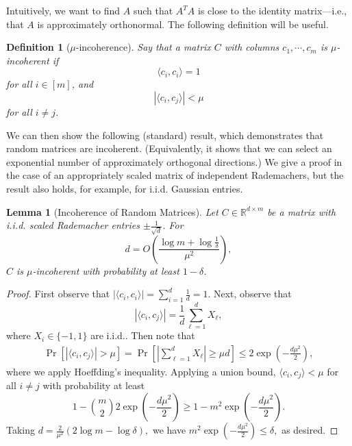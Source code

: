 \documentclass[11pt]{article}
\newtheorem{lemma}[theorem]{Lemma}
\newtheorem{definition}[theorem]{Definition}
\newcommand{\RR}{\mathbb{R}}
\begin{document}
Intuitively, we want to find $A$ such that $A^TA$ is close to the identity matrix---i.e., that $A$ is approximately orthonormal. The following definition will be useful.

\begin{definition}[$\mu$-incoherence]
    Say that a matrix $C$ with columns $c_1,\cdots,c_m$ is $\mu$-incoherent if 
    \begin{equation}
        \langle c_i, c_i\rangle = 1
    \end{equation}
    for all $i\in [m]$, and
    \begin{equation}
        |\langle c_i, c_j\rangle| < \mu
    \end{equation}
    for all $i\neq j$.
\end{definition}

We can then show the following (standard) result, which demonstrates that random matrices are incoherent. (Equivalently, it shows that we can select an exponential number of approximately orthogonal directions.) We give a proof in the case of an appropriately scaled matrix of independent Rademachers, but the result also holds, for example, for i.i.d. Gaussian entries.
\begin{lemma}[Incoherence of Random Matrices]\label{prop:incoherent}
    Let $C\in \RR^{d\times m}$ be a matrix with i.i.d. scaled Rademacher entries $\pm\frac{1}{\sqrt{d}}$. For
    \begin{equation}
        d = O\left(\frac{\log m + \log \frac{1}{\delta}}{\mu^2}\right),
    \end{equation}
    $C$ is $\mu$-incoherent with probability at least $1 - \delta$.
\end{lemma}
\begin{proof}
    First observe that $|\langle c_i, c_i\rangle| = \sum_{i=1}^d \frac{1}{d} = 1.$ Next, observe that
    \begin{equation}
        |\langle c_i, c_j\rangle| = \frac{1}{d}\sum_{\ell=1}^d X_\ell,
    \end{equation}
    where $X_i\in \{-1,1\}$ are i.i.d.. Then note that
    \begin{align}
        \Pr[|\langle c_i, c_j\rangle| > \mu] = \Pr\left[\left|\sum_{\ell=1}^d X_\ell\right|\ge \mu d\right] \le 2\exp\left(-\frac{d\mu^2}{2}\right),
    \end{align}
    where we apply Hoeffding's inequality. Applying a union bound, $\langle c_i, c_j \rangle < \mu$ for all $i\neq j$ with probability at least
    \begin{equation}
        1 - \binom{m}{2}2\exp\left(-\frac{d\mu^2}{2}\right) \ge 1 - m^2\exp\left(-\frac{d\mu^2}{2}\right).
    \end{equation}
    Taking $d = \frac{2}{\mu^2}(2\log m - \log \delta),$ we have $m^2\exp\left(-\frac{d\mu^2}{2}\right) \le \delta,$ as desired.
\end{proof}
\end{document}
